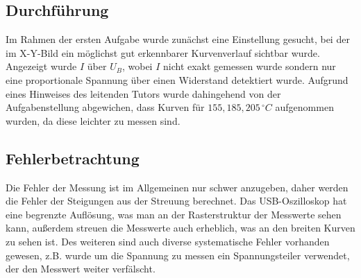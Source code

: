 \subsection{Durchführung}
Im Rahmen der ersten Aufgabe wurde zunächst eine Einstellung gesucht, bei der im X-Y-Bild ein möglichst gut erkennbarer Kurvenverlauf sichtbar wurde. Angezeigt wurde \(I\) über \(U_B\), wobei \(I\) nicht exakt gemessen wurde sondern nur eine proportionale Spannung über einen Widerstand detektiert wurde. Aufgrund eines Hinweises des leitenden Tutors wurde dahingehend von der Aufgabenstellung abgewichen, dass Kurven für \(155, 185, 205\, ^\circ C\) aufgenommen wurden, da diese leichter zu messen sind.
\subsection{Fehlerbetrachtung}
Die Fehler der Messung ist im Allgemeinen nur schwer anzugeben, daher werden die Fehler der Steigungen aus der Streuung berechnet. Das USB-Oszilloskop hat eine begrenzte Auflösung, was man an der Rasterstruktur der Messwerte sehen kann, außerdem streuen die Messwerte auch erheblich, was an den breiten Kurven zu sehen ist. Des weiteren sind auch diverse systematische Fehler vorhanden gewesen, z.B. wurde um die Spannung zu messen ein Spannungsteiler verwendet, der den Messwert weiter verfälscht.
